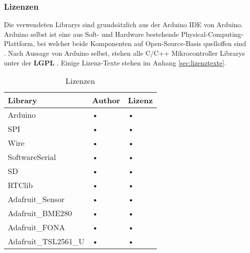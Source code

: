 \subsubsection{Lizenzen}
\label{subsubsec:lizenzen}

Die verwendeten Librarys sind grundsätzlich aus der Arduino IDE von Arduino. Arduino selbst ist eine aus Soft- und Hardware bestehende Physical-Computing-Plattform, bei welcher beide Komponenten auf Open-Source-Basis quelloffen sind \cite{arduinoWiki}. Nach Aussage von Arduino selbst, stehen alle C/C++ Mikrocontroller Librarys unter der \textbf{LGPL} \cite{ArduinoLicense2019}. Einige Lizenz-Texte stehen im Anhang \ref{sec:lizenztexte}. \\


\begin{table}[h]
\centering
\caption{Lizenzen}
\label{tab:lizenzen}
\begin{tabular}{|l|l|l|}
\hline 
\textbf{Library} & \textbf{Author} & \textbf{Lizenz} \\ 
\hline 
Arduino & • & • \\ 
\hline 
SPI & • & • \\ 
\hline 
Wire & • & • \\ 
\hline 
SoftwareSerial & • & • \\ 
\hline 
SD & • & • \\ 
\hline 
RTClib & • & • \\ 
\hline 
Adafruit\_Sensor & • & • \\ 
\hline 
Adafruit\_BME280 & • & • \\ 
\hline 
Adafruit\_FONA & • & • \\ 
\hline 
Adafruit\_TSL2561\_U & • & • \\ 
\hline 
\end{tabular} 
\end{table}